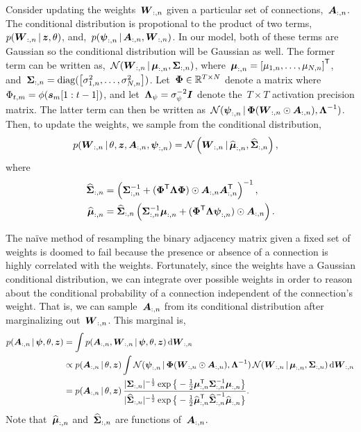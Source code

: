 Consider updating the weights~$\boldsymbol{W}_{:,n}$ given a particular set of connections,~$\boldsymbol{A}_{:,n}$. The conditional distribution is propotional to the product of two terms,~$p(\boldsymbol{W}_{:,n} \,|\, \boldsymbol{z}, \theta)$, and,~$p(\boldsymbol{\psi}_{:,n} \,|\, \boldsymbol{A}_{:,n}, \boldsymbol{W}_{:,n})$. In our model, both of these terms are Gaussian so the conditional distribution will be Gaussian as well. The former term can be written as,~$\mathcal{N}(\boldsymbol{W}_{:,n} \,|\, \boldsymbol{\mu}_{:,n}, \boldsymbol{\Sigma}_{:,n})$, where~$\boldsymbol{\mu}_{:,n} = \left[\mu_{1,n}, \ldots, \mu_{N,n} \right]^{\mathsf{T}}$, and~$\boldsymbol{\Sigma}_{:,n} = \mathrm{diag}(\left[\sigma_{1,n}^2, \ldots, \sigma_{N,n}^2 \right])$. Let~$\boldsymbol{\Phi} \in \mathbb{R}^{T \times N}$ denote a matrix where~$\Phi_{t,m}=\phi(\boldsymbol{s}_m[1:t-1])$, and let~$\boldsymbol{\Lambda}_\psi = \sigma_\psi^{-2} \boldsymbol{I}$ denote the~$T \times T$ activation precision matrix. The latter term can then be written as~$\mathcal{N}(\boldsymbol{\psi}_{:,n} \,|\, \boldsymbol{\Phi} (\boldsymbol{W}_{:,n} \odot \boldsymbol{A}_{:,n}), \boldsymbol{\Lambda}^{-1})$. Then, to update the weights, we sample from the conditional distribution,
\begin{align}
p(\boldsymbol{W}_{:,n} \,|\, \theta, \boldsymbol{z}, \boldsymbol{A}_{:,n}, \boldsymbol{\psi}_{:,n}) &= \mathcal{N} \left( \boldsymbol{W}_{:,n} \,|\, \widehat{\boldsymbol{\mu}}_{:,n}, \widehat{\boldsymbol{\Sigma}}_{:,n} \right),
\end{align}
where
\begin{align}
\widehat{\boldsymbol{\Sigma}}_{:,n} &= \left( \boldsymbol{\Sigma}_{:,n}^{-1} + (\boldsymbol{\Phi}^{\mathsf{T}} \boldsymbol{\Lambda} \boldsymbol{\Phi}) \odot \boldsymbol{A}_{:,n} \boldsymbol{A}_{:,n}^{\mathsf{T}} \right)^{-1}, \\
\widehat{\boldsymbol{\mu}}_{:,n} &= \widehat{\boldsymbol{\Sigma}}_{:,n}
\left( \boldsymbol{\Sigma}_{:,n}^{-1} \boldsymbol{\mu}_{:,n} + (\boldsymbol{\Phi}^{\mathsf{T}} \boldsymbol{\Lambda} \boldsymbol{\psi}_{:,n}) \odot \boldsymbol{A}_{:,n} \right).
\end{align}

The na\"ive method of resampling the binary adjacency matrix given a fixed set of weights is doomed to fail because the presence or absence of a connection is highly correlated with the weights. Fortunately, since the weights have a Gaussian conditional distribution, we can integrate over possible weights in order to reason about the conditional probability of a connection independent of the connection's weight. That is, we can sample~$\boldsymbol{A}_{:,n}$ from its conditional distribution after marginalizing out~$\boldsymbol{W}_{:,n}$. This marginal is,
\begin{align}
p(\boldsymbol{A}_{:,n} \,|\, \boldsymbol{\psi}, \theta, \boldsymbol{z}) 
&= \int p(\boldsymbol{A}_{:,n}, \boldsymbol{W}_{:,n} \,|\, \boldsymbol{\psi}, \theta, \boldsymbol{z}) \, \mathrm{d} \boldsymbol{W}_{:,n} \\
&\propto p(\boldsymbol{A}_{:,n} \,|\, \theta, \boldsymbol{z}) \int \mathcal{N}(\boldsymbol{\psi}_{:,n} \,|\, \boldsymbol{\Phi} (\boldsymbol{W}_{:,n} \odot \boldsymbol{A}_{:,n}), \boldsymbol{\Lambda}^{-1}) \, \mathcal{N}(\boldsymbol{W}_{:,n} \,|\, \boldsymbol{\mu}_{:,n}, \boldsymbol{\Sigma}_{:,n}) \, \mathrm{d} \boldsymbol{W}_{:,n} \\
&= p(\boldsymbol{A}_{:,n} \,|\, \theta, \boldsymbol{z})  \,
\frac{
|\boldsymbol{\Sigma}_{:,n}|^{-\frac{1}{2}}
\exp \big\{-\frac{1}{2} {\boldsymbol{\mu}}_{:,n}^{\mathsf{T}} {\boldsymbol{\Sigma}}_{:,n}^{-1} {\boldsymbol{\mu}}_{:,n} \big\}
}
{
|\widehat{\boldsymbol{\Sigma}}_{:,n}|^{-\frac{1}{2}}
\exp \big\{-\frac{1}{2} \widehat{\boldsymbol{\mu}}_{:,n}^{\mathsf{T}} \widehat{\boldsymbol{\Sigma}}_{:,n}^{-1} \widehat{\boldsymbol{\mu}}_{:,n} \big\} 
}.
\end{align}
Note that~$\widehat{\boldsymbol{\mu}}_{:,n}$ and~$\widehat{\boldsymbol{\Sigma}}_{:,n}$ are functions of~$\boldsymbol{A}_{:,n}$. 

